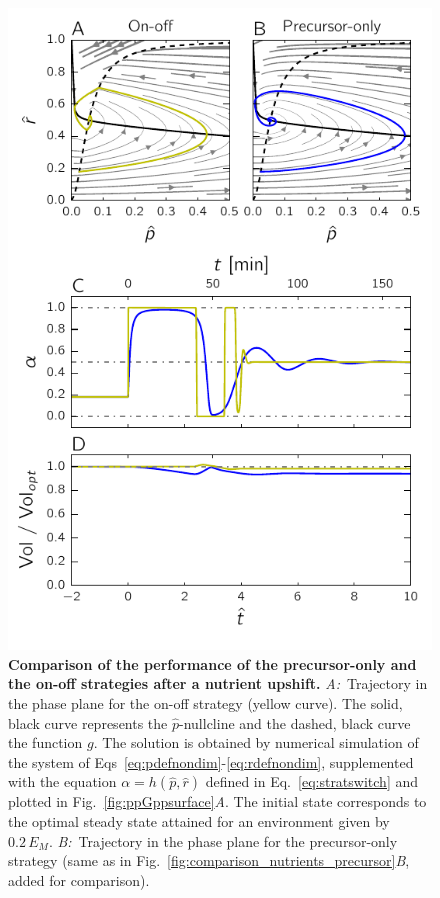 \begin{figure}[p]
\centering
\includegraphics[scale=1]{./Fig/Fig7}
\caption{
\textbf{Comparison of the performance of the precursor-only and the on-off strategies after a nutrient upshift.}
\textit{A:}~Trajectory in the phase plane for the on-off strategy (yellow curve).
The solid, black curve represents the $\hat{p}$-nullcline and the dashed, black curve the function $g$.
The solution is obtained by numerical simulation of the system of Eqs~\ref{eq:pdefnondim}-\ref{eq:rdefnondim}, supplemented with the equation $\alpha = h(\hat{p},\hat{r})$ defined in Eq.~\ref{eq:stratswitch} and plotted in Fig.~\ref{fig:ppGppsurface}\textit{A}.
The initial state corresponds to the optimal steady state attained for an environment given by $0.2 \, E_M$.
\textit{B:}~Trajectory in the phase plane for the precursor-only strategy (same as in Fig.~\ref{fig:comparison_nutrients_precursor}\textit{B}, added for comparison).
}
\end{figure}
